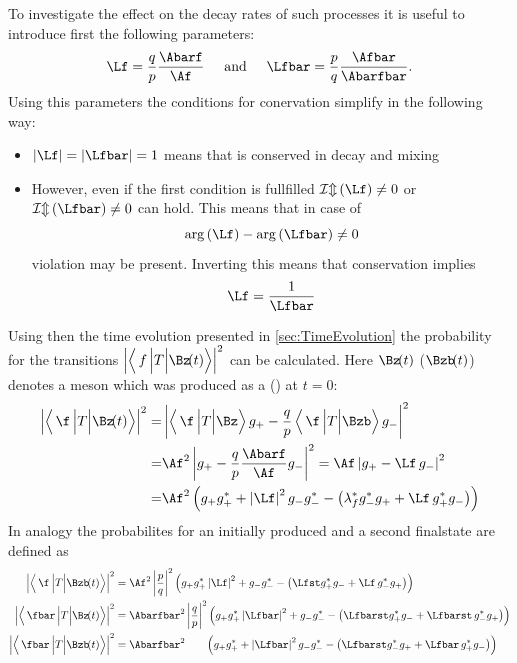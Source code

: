 To investigate the effect on the decay rates of such processes it is useful to introduce first the following parameters:
\begin{equation}
\Lf=\frac{q}{p}\frac{\Abarf}{\Af}\hspace{0.5cm}\text{and}
\hspace{0.5cm}\Lfbar=\frac{p}{q}\frac{\Afbar}{\Abarfbar}.
\end{equation}
Using this parameters the conditions for \CP conervation simplify in the following way:
\begin{itemize}
	\item $\left|\Lf\right|=\left|\Lfbar\right| = 1$ means that \CP is conserved in decay and mixing
	\item However, even if the first condition is fullfilled $\mathcal{Im}\left(\Lf\right)\neq0$ or $\mathcal{Im}\left(\Lfbar\right)\neq0$ can hold. This means that in case of
	\begin{equation}
	\arg\left(\Lf\right)-\arg\left(\Lfbar\right)\neq0 \label{eq:conditionCPV}
	\end{equation}
	\CP violation may be present. Inverting this means that \CP conservation implies
	\begin{equation}
	\Lf=\frac{1}{\Lfbar}
	\end{equation}
\end{itemize}
Using then the time evolution presented in \cref{sec:TimeEvolution} the probability for the transitions $\left|\left<\,f\,\Big|T\Big|\Bz\!(t)\right>\right|^2$ can be calculated.
Here $\Bz\!(t)$ ($\Bzb\!(t)$) denotes a \B meson which was produced as a \Bz (\Bzb) at $t=0$:
\begin{align}
\left|\left<\,\f\,\Big|T\Big|\Bz\!(t)\right>\right|^2 =&
\left|\left<\,\f\,\Big|T\Big|\Bz\right>g_+-\frac{q}{p}\left<\,\f\,\Big|T\Big|\Bzb\right>g_-\right|^2\nonumber\\
=&\Af^2\left|g_+ - \frac{q}{p}\frac{\Abarf}{\Af} g_-\right|^2=\Af\left|g_+ -\Lf\,g_-\right|^2\nonumber\\
=&\Af^2\left(g_+g_+^*+\left|\Lf\right|^2g_-g_-^*-\left(\lambda_{f}^*g_-^*g_+ + \Lf\,g_+^* g_-\right)\right)
\end{align}
In analogy the probabilites for an initially produced \Bzb and a second finalstate \fbar are defined as
\begin{align}
\left|\left<\,\f\,\Big|T\Big|\Bzb\!(t)\right>\right|^2 &=
\Af^2\left|\frac{p}{q}\right|^2\left(g_+g_+^*\left|\Lf\right|^2+g_-g_-^*-\left(\Lfst g_+^*g_- + \Lf\,g_-^* g_+\right)\right)\\
\left|\left<\,\fbar\,\Big|T\Big|\Bz\!(t)\right>\right|^2 &=
\Abarfbar^2\left|\frac{q}{p}\right|^2\left(g_+g_+^*\left|\Lfbar\right|^2+g_-g_-^*-\left(\Lfbarst g_+^*g_- + \Lfbarst\,g_-^* g_+\right)\right)\\
\left|\left<\,\fbar\,\Big|T\Big|\Bzb\!(t)\right>\right|^2 &=
\Abarfbar^2\hphantom{\left|\frac{q}{p}\right|^2}\left(g_+g_+^*+\left|\Lfbar\right|^2g_-g_-^*-\left(\Lfbarst g_-^*g_+ + \Lfbar\,g_+^* g_-\right)\right)
\end{align}
